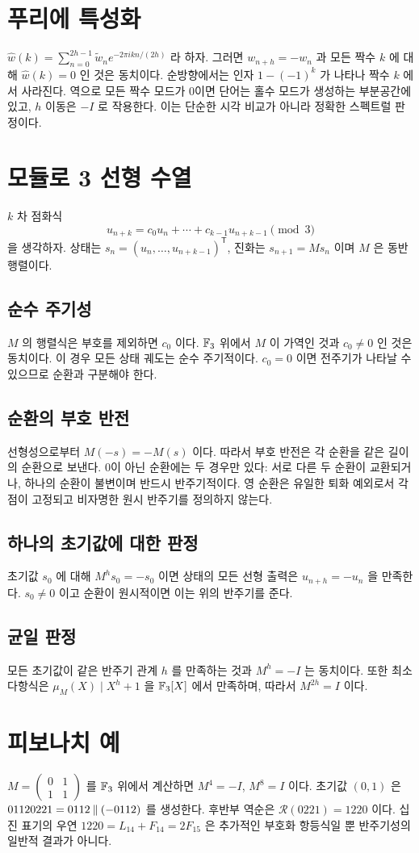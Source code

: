 \documentclass[11pt,a4paper]{article}
\begin{document}
\section{푸리에 특성화}
\(\widehat w(k)=\sum_{n=0}^{2h-1}\widetilde w_ne^{-2\pi i kn/(2h)}\) 라 하자. 그러면 \(w_{n+h}=-w_n\) 과 모든 짝수 \(k\) 에 대해 \(\widehat w(k)=0\) 인 것은 동치이다. 순방향에서는 인자 \(1-(-1)^k\) 가 나타나 짝수 \(k\) 에서 사라진다. 역으로 모든 짝수 모드가 0이면 단어는 홀수 모드가 생성하는 부분공간에 있고, \(h\) 이동은 \(-I\) 로 작용한다. 이는 단순한 시각 비교가 아니라 정확한 스펙트럴 판정이다.
\section{모듈로 3 선형 수열}
\(k\) 차 점화식 \[u_{n+k}=c_0u_n+\cdots+c_{k-1}u_{n+k-1}\pmod3\] 을 생각하자. 상태는 \(s_n=(u_n,\ldots,u_{n+k-1})^{\mathsf T}\), 진화는 \(s_{n+1}=Ms_n\) 이며 \(M\) 은 동반행렬이다.
\subsection{순수 주기성}
\(M\) 의 행렬식은 부호를 제외하면 \(c_0\) 이다. \(\mathbb F_3\) 위에서 \(M\) 이 가역인 것과 \(c_0\neq0\) 인 것은 동치이다. 이 경우 모든 상태 궤도는 순수 주기적이다. \(c_0=0\) 이면 전주기가 나타날 수 있으므로 순환과 구분해야 한다.
\subsection{순환의 부호 반전}
선형성으로부터 \(M(-s)=-M(s)\) 이다. 따라서 부호 반전은 각 순환을 같은 길이의 순환으로 보낸다. 0이 아닌 순환에는 두 경우만 있다: 서로 다른 두 순환이 교환되거나, 하나의 순환이 불변이며 반드시 반주기적이다. 영 순환은 유일한 퇴화 예외로서 각 점이 고정되고 비자명한 원시 반주기를 정의하지 않는다.
\subsection{하나의 초기값에 대한 판정}
초기값 \(s_0\) 에 대해 \(M^hs_0=-s_0\) 이면 상태의 모든 선형 출력은 \(u_{n+h}=-u_n\) 을 만족한다. \(s_0\neq0\) 이고 순환이 원시적이면 이는 위의 반주기를 준다.
\subsection{균일 판정}
모든 초기값이 같은 반주기 관계 \(h\) 를 만족하는 것과 \(M^h=-I\) 는 동치이다. 또한 최소다항식은 \(\mu_M(X)\mid X^h+1\) 을 \(\mathbb F_3[X]\) 에서 만족하며, 따라서 \(M^{2h}=I\) 이다.
\section{피보나치 예}
\(M=\begin{pmatrix}0&1\\1&1\end{pmatrix}\) 를 \(\mathbb F_3\) 위에서 계산하면 \(M^4=-I\), \(M^8=I\) 이다. 초기값 \((0,1)\) 은 \(01120221=0112\mathbin{\Vert}(-0112)\) 를 생성한다. 후반부 역순은 \(\mathcal R(0221)=1220\) 이다. 십진 표기의 우연 \(1220=L_{14}+F_{14}=2F_{15}\) 은 추가적인 부호화 항등식일 뿐 반주기성의 일반적 결과가 아니다.
\end{document}
